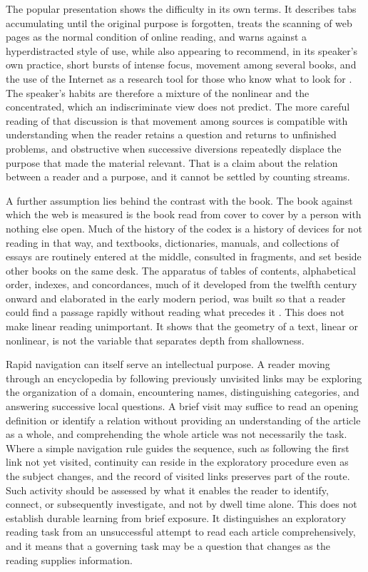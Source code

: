 \documentclass[12pt]{article}
\begin{document}
The popular presentation shows the difficulty in its own terms. It describes tabs accumulating until the original purpose is forgotten, treats the scanning of web pages as the normal condition of online reading, and warns against a hyperdistracted style of use, while also appearing to recommend, in its speaker's own practice, short bursts of intense focus, movement among several books, and the use of the Internet as a research tool for those who know what to look for \cite{academicagent2026}. The speaker's habits are therefore a mixture of the nonlinear and the concentrated, which an indiscriminate view does not predict. The more careful reading of that discussion is that movement among sources is compatible with understanding when the reader retains a question and returns to unfinished problems, and obstructive when successive diversions repeatedly displace the purpose that made the material relevant. That is a claim about the relation between a reader and a purpose, and it cannot be settled by counting streams.

A further assumption lies behind the contrast with the book. The book against which the web is measured is the book read from cover to cover by a person with nothing else open. Much of the history of the codex is a history of devices for not reading in that way, and textbooks, dictionaries, manuals, and collections of essays are routinely entered at the middle, consulted in fragments, and set beside other books on the same desk. The apparatus of tables of contents, alphabetical order, indexes, and concordances, much of it developed from the twelfth century onward and elaborated in the early modern period, was built so that a reader could find a passage rapidly without reading what precedes it \cite{rouse1982statim, saenger1997space}. This does not make linear reading unimportant. It shows that the geometry of a text, linear or nonlinear, is not the variable that separates depth from shallowness.

Rapid navigation can itself serve an intellectual purpose. A reader moving through an encyclopedia by following previously unvisited links may be exploring the organization of a domain, encountering names, distinguishing categories, and answering successive local questions. A brief visit may suffice to read an opening definition or identify a relation without providing an understanding of the article as a whole, and comprehending the whole article was not necessarily the task. Where a simple navigation rule guides the sequence, such as following the first link not yet visited, continuity can reside in the exploratory procedure even as the subject changes, and the record of visited links preserves part of the route. Such activity should be assessed by what it enables the reader to identify, connect, or subsequently investigate, and not by dwell time alone. This does not establish durable learning from brief exposure. It distinguishes an exploratory reading task from an unsuccessful attempt to read each article comprehensively, and it means that a governing task may be a question that changes as the reading supplies information.
\end{document}

